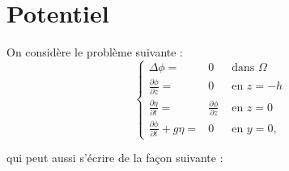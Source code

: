\documentclass{article}
\theoremstyle{plain}
\numberwithin{equation}{section} %
\begin{document}
\section{Potentiel}

On consid\`ere le probl\`eme suivante :
\[
	\left\{
		\begin{array}{rcl}
   			\Delta \phi  =& 0  &\text{ dans }\Omega \\
   			\frac{\partial \phi }{ \partial z} =& 0 & \text{ en }z=-h \\
   			\frac{\partial \eta }{ \partial t} =& \frac{\partial \phi }{ \partial z} & \text{ en }z=0 \\
   			\frac{\partial \phi }{ \partial t} + g\eta =& 0 & \text{ en }y=0,
  		\end{array}
	\right.
\]

qui peut aussi s'\'ecrire de la fa\c con suivante : 
\end{document}
